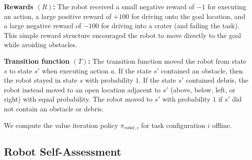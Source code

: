 \documentclass[aaai]{article}
\begin{document}
\textbf{Rewards $(R)$:} The robot received a small negative reward of $-1$ for executing an action, a large positive reward of $+100$ for driving onto the goal location, and a large negative reward of $-100$ for driving into a crater (and failing the task). This simple reward structure encouraged the robot to move directly to the goal while avoiding obstacles.

\textbf{Transition function $(T)$:} The transition function moved the robot from state $s$ to state $s'$ when executing action $a$. If the state $s'$ contained an obstacle, then the robot stayed in state $s$ with probability $1$. If the state $s'$ contained debris, the robot instead moved to an open location adjacent to $s'$ (above, below, left, or right) with equal probability. The robot moved to $s'$ with probability $1$ if $s'$ did not contain an obstacle or debris.

We compute the value iteration policy $\pi_{robot,i}$ for task configuration $i$  offline.

\subsection{Robot Self-Assessment}
\end{document}
